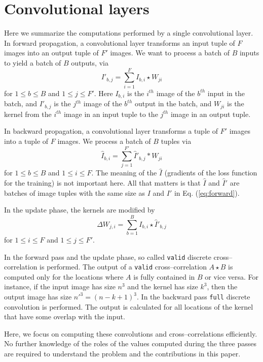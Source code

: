 \section{Convolutional layers} \label{sec-conv-layers}

  Here we summarize the computations performed by a single
  convolutional layer.  In forward propagation, a convolutional layer
  transforms an input tuple of $F$ images into an output tuple of $F'$
  images.  We want to process a batch of $B$ inputs to yield a batch
  of $B$ outputs, via
  \begin{equation}\label{eq:forward}
  I'_{b,j} = \sum_{i=1}^F I_{b,i}\star W_{ji}
  \end{equation}
  for $1 \le b \le B$ and $1 \le j \le F'$.  Here $I_{b,i}$ is the
  $i^{th}$ image of the $b^{th}$ input in the batch, and $I'_{b,j}$ is
  the $j^{th}$ image of the $b^{th}$ output in the batch, and $W_{ji}$
  is the kernel from the $i^{th}$ image in an input tuple to the
  $j^{th}$ image in an output tuple.

  In backward propagation, a convolutional layer transforms a tuple of
  $F'$ images into a tuple of $F$ images.  We process a batch of $B$
  tuples via
  \begin{equation}\label{eq:backward}
  \hat{I}_{b,i} = \sum_{j=1}^{F'} \hat{I}'_{b,j} \ast W_{ji}
  \end{equation}
  for $1 \le b \le B$ and $1 \le i \le F$.  The meaning of the
  $\hat{I}$ (gradients of the loss function for the training) is not
  important here.  All that matters is that $\hat{I}$ and $\hat{I}'$
  are batches of image tuples with the same size as $I$ and $I'$ in
  Eq. (\ref{eq:forward}).

  In the update phase, the kernels are modified by
  \[
  \Delta W_{j,i} = \sum_{b=1}^B I_{b,i} \star \hat{I}'_{b,j}
  \]
  for $1 \le i \le F$ and $1 \le j \le F'$.

  In the forward pass and the update phase, so called \texttt{valid}
  discrete cross--correlation is performed.  The output of a
  \texttt{valid} cross--correlation $A \star B$ is computed only for
  the locations where $A$ is fully contained in $B$ or vice versa.
  For instance, if the input image has size $n^3$ and the kernel has
  size $k^3$, then the output image has size $n'^3 = (n-k+1)^3$.  In
  the backward pass \texttt{full} discrete convolution is performed.
  The output is calculated for all locations of the kernel that have
  some overlap with the input.

  Here, we focus on computing these convolutions and
  cross--correlations efficiently.  No further knowledge of the roles
  of the values computed during the three passes are required to
  understand the problem and the contributions in this paper.

